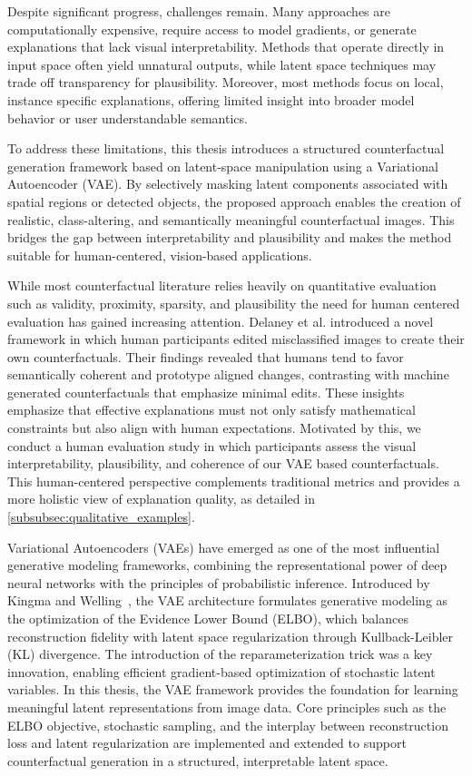 Despite significant progress, challenges remain. Many approaches are computationally expensive, require access to model gradients, or generate explanations that lack visual interpretability. Methods that operate directly in input space often yield unnatural outputs, while latent space techniques may trade off transparency for plausibility.  Moreover, most methods focus on local, instance specific explanations, offering limited insight into broader model behavior or user understandable semantics.

To address these limitations, this thesis introduces a structured counterfactual generation framework based on latent-space manipulation using a Variational Autoencoder (VAE). By selectively masking latent components associated with spatial regions or detected objects, the proposed approach enables the creation of realistic, class-altering, and semantically meaningful counterfactual images. This bridges the gap between interpretability and plausibility and makes the method suitable for human-centered, vision-based applications.

While most counterfactual literature relies heavily on quantitative evaluation such as validity, proximity, sparsity, and plausibility the need for human centered evaluation has gained increasing attention. Delaney et al.\cite{DELANEY2023103995} introduced a novel framework in which human participants edited misclassified images to create their own counterfactuals. Their findings revealed that humans tend to favor semantically coherent and prototype aligned changes, contrasting with machine generated counterfactuals that emphasize minimal edits. These insights emphasize that effective explanations must not only satisfy mathematical constraints but also align with human expectations. Motivated by this, we conduct a human evaluation study in which participants assess the visual interpretability, plausibility, and coherence of our VAE based counterfactuals. This human-centered perspective complements traditional metrics and provides a more holistic view of explanation quality, as detailed in \cref{subsubsec:qualitative_examples}.


Variational Autoencoders (VAEs) have emerged as one of the most influential generative modeling frameworks, combining the representational power of deep neural networks with the principles of probabilistic inference. Introduced by Kingma and Welling~\cite{Kingma_2019}, the VAE architecture formulates generative modeling as the optimization of the Evidence Lower Bound (ELBO), which balances reconstruction fidelity with latent space regularization through Kullback-Leibler (KL) divergence. The introduction of the reparameterization trick was a key innovation, enabling efficient gradient-based optimization of stochastic latent variables. In this thesis, the VAE framework provides the foundation for learning meaningful latent representations from image data. Core principles such as the ELBO objective, stochastic sampling, and the interplay between reconstruction loss and latent regularization are implemented and extended to support counterfactual generation in a structured, interpretable latent space.

